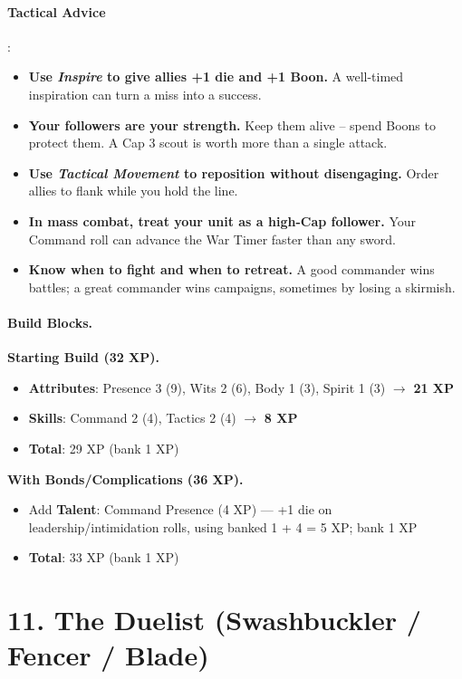 \paragraph{Tactical Advice}:
\begin{itemize}
\item \textbf{Use \emph{Inspire} to give allies +1 die and +1 Boon.} A well-timed inspiration can turn a miss into a success.
\item \textbf{Your followers are your strength.} Keep them alive -- spend Boons to protect them. A Cap 3 scout is worth more than a single attack.
\item \textbf{Use \emph{Tactical Movement} to reposition without disengaging.} Order allies to flank while you hold the line.
\item \textbf{In mass combat, treat your unit as a high-Cap follower.} Your Command roll can advance the War Timer faster than any sword.
\item \textbf{Know when to fight and when to retreat.} A good commander wins battles; a great commander wins campaigns, sometimes by losing a skirmish.
\end{itemize}

\paragraph{Build Blocks.}
\textbf{Starting Build (32 XP).}
\begin{itemize}
\item \textbf{Attributes}: Presence 3 (9), Wits 2 (6), Body 1 (3), Spirit 1 (3) \(\rightarrow\) \textbf{21 XP}
\item \textbf{Skills}: Command 2 (4), Tactics 2 (4) \(\rightarrow\) \textbf{8 XP}
\item \textbf{Total}: 29 XP (bank 1 XP)
\end{itemize}
\textbf{With Bonds/Complications (36 XP).}
\begin{itemize}
\item Add \textbf{Talent}: Command Presence (4 XP) --- +1 die on leadership/intimidation rolls, using banked 1 + 4 = 5 XP; bank 1 XP
\item \textbf{Total}: 33 XP (bank 1 XP)
\end{itemize}

\section{11. The Duelist (Swashbuckler / Fencer / Blade)}
\label{sec:concept-duelist}

